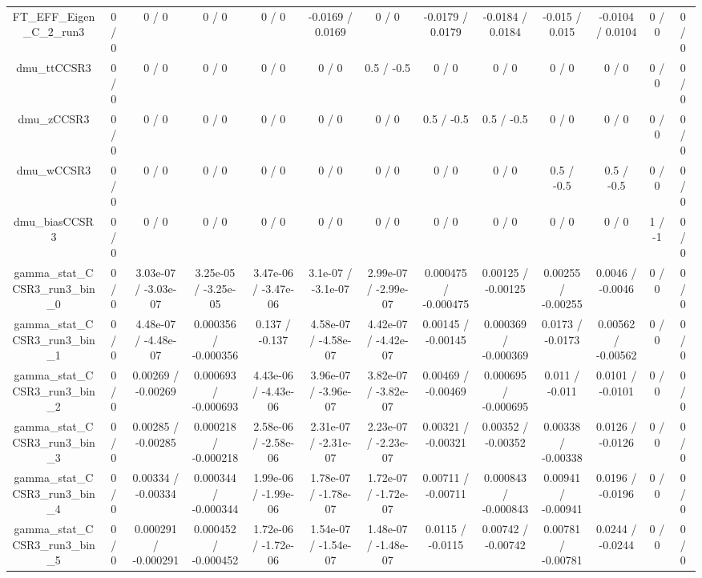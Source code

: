 \documentclass[10pt]{article}
\begin{document}
\begin{table}[htbp]
\begin{center}
\begin{tabular}{|c|c|c|c|c|c|c|c|c|c|c|c|c|}
  FT_EFF_Eigen_C_2_run3 & 0 / 0 & 0 / 0 & 0 / 0 & 0 / 0 & -0.0169 / 0.0169 & 0 / 0 & -0.0179 / 0.0179 & -0.0184 / 0.0184 & -0.015 / 0.015 & -0.0104 / 0.0104 & 0 / 0 & 0 / 0 \\ 
  dmu_ttCCSR3 & 0 / 0 & 0 / 0 & 0 / 0 & 0 / 0 & 0 / 0 & 0.5 / -0.5 & 0 / 0 & 0 / 0 & 0 / 0 & 0 / 0 & 0 / 0 & 0 / 0 \\ 
  dmu_zCCSR3 & 0 / 0 & 0 / 0 & 0 / 0 & 0 / 0 & 0 / 0 & 0 / 0 & 0.5 / -0.5 & 0.5 / -0.5 & 0 / 0 & 0 / 0 & 0 / 0 & 0 / 0 \\ 
  dmu_wCCSR3 & 0 / 0 & 0 / 0 & 0 / 0 & 0 / 0 & 0 / 0 & 0 / 0 & 0 / 0 & 0 / 0 & 0.5 / -0.5 & 0.5 / -0.5 & 0 / 0 & 0 / 0 \\ 
  dmu_biasCCSR3 & 0 / 0 & 0 / 0 & 0 / 0 & 0 / 0 & 0 / 0 & 0 / 0 & 0 / 0 & 0 / 0 & 0 / 0 & 0 / 0 & 1 / -1 & 0 / 0 \\ 
  gamma_stat_CCSR3_run3_bin_0 & 0 / 0 & 3.03e-07 / -3.03e-07 & 3.25e-05 / -3.25e-05 & 3.47e-06 / -3.47e-06 & 3.1e-07 / -3.1e-07 & 2.99e-07 / -2.99e-07 & 0.000475 / -0.000475 & 0.00125 / -0.00125 & 0.00255 / -0.00255 & 0.0046 / -0.0046 & 0 / 0 & 0 / 0 \\ 
  gamma_stat_CCSR3_run3_bin_1 & 0 / 0 & 4.48e-07 / -4.48e-07 & 0.000356 / -0.000356 & 0.137 / -0.137 & 4.58e-07 / -4.58e-07 & 4.42e-07 / -4.42e-07 & 0.00145 / -0.00145 & 0.000369 / -0.000369 & 0.0173 / -0.0173 & 0.00562 / -0.00562 & 0 / 0 & 0 / 0 \\ 
  gamma_stat_CCSR3_run3_bin_2 & 0 / 0 & 0.00269 / -0.00269 & 0.000693 / -0.000693 & 4.43e-06 / -4.43e-06 & 3.96e-07 / -3.96e-07 & 3.82e-07 / -3.82e-07 & 0.00469 / -0.00469 & 0.000695 / -0.000695 & 0.011 / -0.011 & 0.0101 / -0.0101 & 0 / 0 & 0 / 0 \\ 
  gamma_stat_CCSR3_run3_bin_3 & 0 / 0 & 0.00285 / -0.00285 & 0.000218 / -0.000218 & 2.58e-06 / -2.58e-06 & 2.31e-07 / -2.31e-07 & 2.23e-07 / -2.23e-07 & 0.00321 / -0.00321 & 0.00352 / -0.00352 & 0.00338 / -0.00338 & 0.0126 / -0.0126 & 0 / 0 & 0 / 0 \\ 
  gamma_stat_CCSR3_run3_bin_4 & 0 / 0 & 0.00334 / -0.00334 & 0.000344 / -0.000344 & 1.99e-06 / -1.99e-06 & 1.78e-07 / -1.78e-07 & 1.72e-07 / -1.72e-07 & 0.00711 / -0.00711 & 0.000843 / -0.000843 & 0.00941 / -0.00941 & 0.0196 / -0.0196 & 0 / 0 & 0 / 0 \\ 
  gamma_stat_CCSR3_run3_bin_5 & 0 / 0 & 0.000291 / -0.000291 & 0.000452 / -0.000452 & 1.72e-06 / -1.72e-06 & 1.54e-07 / -1.54e-07 & 1.48e-07 / -1.48e-07 & 0.0115 / -0.0115 & 0.00742 / -0.00742 & 0.00781 / -0.00781 & 0.0244 / -0.0244 & 0 / 0 & 0 / 0 \\ 

\end{tabular}
\end{center}
\end{table}
\end{document}
